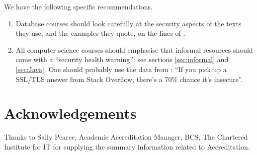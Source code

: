 \documentclass[sigconf,anonymous]{acmart}
\begin{document}
We have the following specific recommendations.
\begin{enumerate}
\item Database courses should look carefully at the security aspects of the texts they use, and the examples they quote, on the lines of \cite{Drop2019}.
\item All computer science courses should emphasise that informal resources should come with a ``security health warning'': see sections \ref{sec:informal} and \ref{sec:Java}. One should probably use the data from \cite{Chenetal2019a}: ``If you pick up a SSL/TLS answer from Stack Overflow, there's a 70\% chance it's insecure''.
\end{enumerate}

\section*{Acknowledgements}
Thanks to Sally Pearce, Academic Accreditation Manager, BCS, The Chartered Institute for IT for supplying the summary information related to Accreditation.


 
\end{document}
